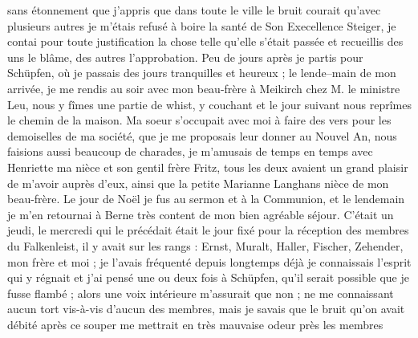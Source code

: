 \documentclass[12pt]{article}
\begin{document}
sans étonnement que j’appris que dans toute le ville le bruit courait qu’avec plusieurs autres je
m’étais refusé à boire la santé de Son Execellence Steiger, je contai pour toute justification la
chose telle qu’elle s’était passée et recueillis des uns le blâme, des autres l’approbation. Peu de
jours après je partis pour Schüpfen, où je passais des jours tranquilles et heureux ; le lende–main
de mon arrivée, je me rendis au soir avec mon beau-frère à Meikirch chez M. le ministre Leu, nous y
fîmes une partie de whist, y couchant et le jour suivant nous reprîmes le chemin de la maison. Ma
soeur s’occupait avec moi à faire des vers pour les demoiselles de ma société, que je me proposais
leur donner au Nouvel An, nous faisions aussi beaucoup de charades, je m’amusais de temps en temps
avec Henriette ma nièce et son gentil frère Fritz, tous les deux avaient un grand plaisir de m’avoir
auprès d’eux, ainsi que la petite Marianne Langhans nièce de mon beau-frère. Le jour de Noël je fus
au sermon et à la Communion, et le lendemain je m’en retournai à Berne très content de mon bien
agréable séjour. C’était un jeudi, le mercredi qui le précédait était le jour fixé pour la réception
des membres du Falkenleist, il y avait sur les rangs : Ernst, Muralt, Haller, Fischer, Zehender, mon
frère et moi ; je l’avais fréquenté depuis longtemps déjà je connaissais l’esprit qui y régnait et
j’ai pensé une ou deux fois à Schüpfen, qu’il serait possible que je fusse flambé ; alors une voix
intérieure m’assurait que non ; ne me connaissant aucun tort vis-à-vis d’aucun des membres, mais je
savais que le bruit qu’on avait débité après ce souper me mettrait en très mauvaise odeur près les
membres
\end{document}
